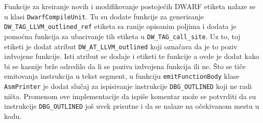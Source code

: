 \documentclass[12pt,oneside]{memoir}
\begin{document}
Funkcije za kreiranje novih i modifikovanje postojećih DWARF etiketa nalaze se u klasi \verb|DwarfCompileUnit|.
Tu su dodate funkcije za generisanje \verb|DW_TAG_LLVM_outlined_ref| etiketa sa ranije opisanim poljima i dodata je pomoćna funkcija za ubacivanje tih etiketa u \verb|DW_TAG_call_site|.
Uz to, toj etiketi je dodat atribut \verb|DW_AT_LLVM_outlined| koji označava da je to poziv izdvojene funkcije.
Isti atribut se dodaje i etiketi te funkcije a ovde je dodat kako bi se kasnije brže odredilo da li se poziva izdvojena funkcija ili ne.
Što se tiče emitovanja instrukcija u tekst segment, u funkciju \verb|emitFunctionBody| klase \verb|AsmPrinter| je dodat slučaj za ispisivanje instrukcije \verb|DBG_OUTLINED| koji ne radi ništa.
Promenom ove implementacije da ispiše komentar može se potvrditi da su instrukcije \verb|DBG_OUTLINED| još uvek prisutne i da se nalaze na očekivanom mestu u kodu.
\end{document}
